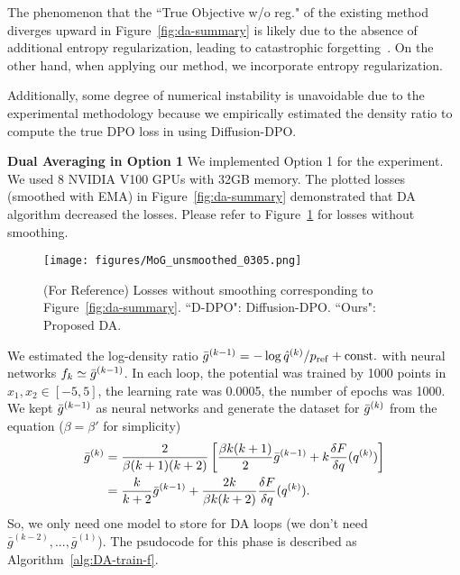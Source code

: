 The phenomenon that the ``True Objective w/o reg." of the existing method diverges upward in Figure~\ref{fig:da-summary} is likely due to the absence of additional entropy regularization, leading to catastrophic forgetting~\cite{uehara2024RLHF,tang2024finetuningdiffusionmodelsstochastic,li2024derivativefreeguidancecontinuousdiscrete,zhao2024scoresactionsframeworkfinetuning}.
On the other hand,  when applying our method, we incorporate entropy regularization.

Additionally, some degree of numerical instability is unavoidable due to the experimental methodology because we empirically estimated the density ratio to compute the true DPO loss in using Diffusion-DPO.

\textbf{Dual Averaging in Option 1}
We implemented Option 1 for the experiment. We used 8 NVIDIA V100 GPUs with 32GB memory.
The plotted losses (smoothed with EMA) in Figure~\ref{fig:da-summary} demonstrated that DA algorithm decreased the losses.
Please refer to Figure~\ref{fig:da-unsmoothed} for losses without smoothing.
\begin{figure}[htbp]
    \centering
    \texttt{[image: figures/MoG\_unsmoothed\_0305.png]}
    \caption{(For Reference) Losses without smoothing corresponding to Figure~\ref{fig:da-summary}. ``D-DPO": Diffusion-DPO. ``Ours": Proposed DA.}
    \label{fig:da-unsmoothed}
\end{figure}
We estimated the log-density ratio $\bar{g}^{(k-1)} = -\log \hat{q}^{(k)} / p_{\rm{ref}} + \mathrm{const}.$ with neural networks $f_k \simeq \bar{g}^{(k-1)}$. In each loop, the potential was trained by 1000 points in $x_1, x_2 \in [-5,5]$, the learning rate was 0.0005, the number of epochs was 1000.
We kept $\bar{g}^{(k-1)}$ as neural networks and generate the dataset for $\bar{g}^{(k)}$ from the equation ($\beta=\beta'$ for simplicity)
\begin{align}
            \bar{g}^{(k)} &= \frac{2}{\beta(k+1)(k+2)}
        \left[
            \frac{\beta k (k+1)}{2}\bar{g}^{(k-1)} + k\frac{\delta F}{\delta q}(q^{(k)})
        \right]\\
        &= \frac{k}{k+2}\bar{g}^{(k-1)} + \frac{2k}{\beta k(k+2)}\frac{\delta F}{\delta q}(q^{(k)}).\label{eq-appendix-experiment-recurrence}
\end{align}
So, we only need one model to store for DA loops (we don't need $\bar{g}^{(k-2)},..., \bar{g}^{(1)}$). 
The psudocode for this phase is described as Algorithm~\ref{alg:DA-train-f}.
    
